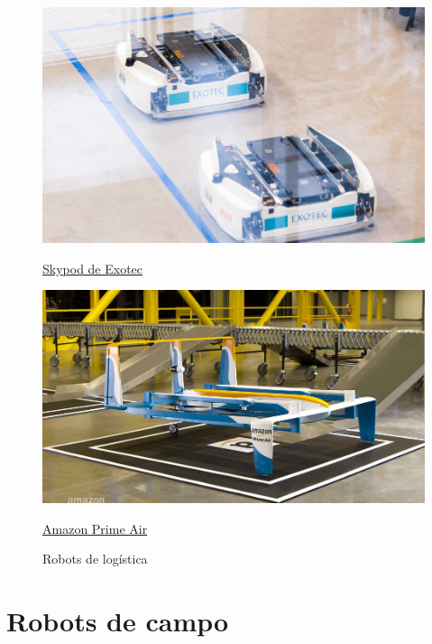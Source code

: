 \begin{figure}[ht!]
	\centering
	\begin{minipage}{0.3\linewidth}
		\centering
		\includegraphics[width=\linewidth]{figs/skypod.png}
		\caption*{\centering\href{https://exotecbydexter.com/skypod/}{Skypod de Exotec} }
	\end{minipage}
	\hspace{3cm}
	\begin{minipage}{0.3\linewidth}
		\centering
		\includegraphics[width=\linewidth]{figs/amazon.png}
		\caption*{\centering\href{https://www.aboutamazon.es/noticias/innovacion/prime-air}{Amazon Prime Air}}
	\end{minipage}
	\caption{Robots de logística}
	\label{fig:robreparto}
\end{figure}

\section{Robots de campo}

